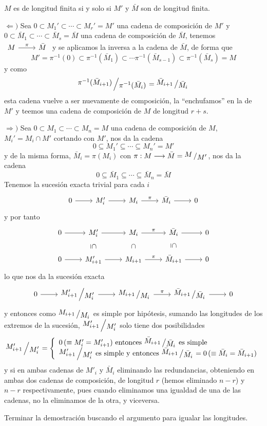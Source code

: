 \begin{prop}
    $M$ es de longitud finita si y solo si $M'$ y $\bar M$ son de longitud finita.
\end{prop}
\begin{dem}
    $\Leftarrow)$ Sea $ 0 \subset M_1' \subset \cdots \subset M_r' = M'$ una cadena de composici\'on de $M'$ y 
    $0 \subset \bar M_1 \subset \cdots \subset \bar M_s = \bar M$  una cadena de composici\'on de $\bar M$, tenemos $\bt M \rar{\pi} & \bar M  \et$ y se aplicamos la inversa a la cadena de $\bar M$, de forma que 
    $$M' = \pi^{-1}( 0) \subset \pi^{-1}( \bar M_1) \subset \cdots \pi^{-1}( \bar M_{s-1}) \subset \pi^{-1}(\bar M_s) = M$$ 
    y como 
    $$\modulo{\pi^{-1}( \bar M_{i+1})}{\pi^{-1}( \bar M_i)} = \modulo{\bar M_{i+1}}{\bar M_i}$$ esta cadena vuelve a ser nuevamente de composici\'on, la ``enchufamos'' en la de $M'$ y teemos una cadena de composici\'on de $M$ de longitud $r + s$. 

    $\Rightarrow)$ Sea $0 \subset M_1 \subset \cdots \subset M_n = M$ una cadena de composici\'on de $M$, $M_i' = M_i \cap M'$ cortando con $M'$, nos da la cadena 
    $$ 0 \subseteq M_1' \subseteq \cdots \subseteq M_n' = M'$$
    y de la misma forma, $\bar M_i = \pi(M_i)$ con $\pi: M \longrightarrow \bar M = \modulo{M}{M'}$, nos da la cadena
    $$ 0 \subseteq \bar M_1 \subseteq \cdots \subseteq \bar M_n = \bar M$$
    Tenemos la sucesi\'on exacta trivial para cada $i$
    $$\bt 0 \rar & M_i' \rar & M_i \rar{\pi} & \bar M_i \rar & 0 \et$$
    y por tanto
     $$\bt 0 \rar & M_i' \arrow[d, phantom, "\rotatebox{-90}{$\subseteq$}"] \rar & M_i \arrow[d, phantom, "\rotatebox{-90}{$\subset$}"]\rar{\pi} & \bar M_i \arrow[d, phantom, "\rotatebox{-90}{$\subseteq$}"] \rar & 0 \\ 0 \rar & M_{i+1}'   \rar & M_{i+1}  \rar{\pi} & \bar M_{i+1} \rar & 0  \et$$
     lo que nos da la sucesi\'on exacta
     $$\bt 0 \rar & \modulo{M'_{i+1}}{M_i'} \rar & \modulo{M_{i+1}}{M_i} \rar{\pi} & \modulo{\bar M_{i+1}}{\bar M_i} \rar & 0 \et$$
     y entonces como $\modulo{M_{i+1}}{M_i}$ es simple por hip\'otesis, sumando las longitudes de los extremos de la sucesi\'on, $\modulo{M'_{i+1}}{M_i'}$ solo tiene dos posibilidades
     $$\modulo{M'_{i+1}}{M_i'} = \left\{ \begin{array}{l}
          0 \,  (\equiv M_i' = M_{i+1}') \text{ entonces } \modulo{\bar M_{i+1}}{\bar M_i} \text{ es simple }   \\
          \modulo{M'_{i+1}}{M_i'} \text{ es simple y entonces } \modulo{\bar M_{i+1}}{\bar M_i} = 0 \, (\equiv \bar M_i = \bar M_{i+1}) 
     \end{array} \right.$$
     y si en ambas cadenas de $M'_i$ y $\bar M_i$ eliminando las redundancias, obteniendo en ambas dos cadenas de composici\'on, de longitud $r$ (hemos eliminado $n-r$) y $n-r$ respectivamente, pues cuando eliminamos una igualdad de una de las cadenas, no la eliminamos de la otra, y viceversa. 

     Terminar la demostraci\'on buscando el argumento para igualar las longitudes. 
\end{dem}
